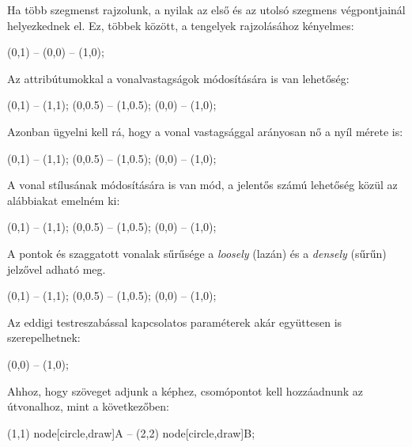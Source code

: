 Ha több szegmenst rajzolunk, a nyilak az első és az utolsó szegmens végpontjainál helyezkednek el. Ez, többek között, a tengelyek rajzolásához kényelmes:

\begin{tikzcode}
\draw [<->] (0,1) -- (0,0) -- (1,0);
\end{tikzcode}

Az attribútumokkal a vonalvastagságok módosítására is van lehetőség:

\begin{tikzcode}
\draw [thin] (0,1) -- (1,1);
\draw [thick] (0,0.5) -- (1,0.5);	
 (0,0) -- (1,0);
\end{tikzcode}

Azonban ügyelni kell rá, hogy a vonal vastagsággal arányosan nő a nyíl mérete is:

\begin{tikzcode}
\draw [->, thin] (0,1) -- (1,1);
\draw [->, thick] (0,0.5) -- (1,0.5);	
 (0,0) -- (1,0);
\end{tikzcode}

A vonal stílusának módosítására is van mód, a jelentős számú lehetőség közül az alábbiakat emelném ki:

\begin{tikzcode}
\draw [dotted] (0,1) -- (1,1);
\draw [dashed] (0,0.5) -- (1,0.5);	
\draw [dashdotted] (0,0) -- (1,0);
\end{tikzcode}

A pontok és szaggatott vonalak sűrűsége a \textit{loosely} (lazán) és a \textit{densely} (sűrűn) jelzővel adható meg.
\begin{tikzcode}
\draw [dashed] (0,1) -- (1,1);
 (0,0.5) -- (1,0.5);	
 (0,0) -- (1,0);
\end{tikzcode}

Az eddigi testreszabással kapcsolatos paraméterek akár együttesen is szerepelhetnek:

\begin{tikzcode}
 (0,0) -- (1,0);
\end{tikzcode}

Ahhoz, hogy szöveget adjunk a képhez, csomópontot kell hozzáadnunk az útvonalhoz, mint a következőben:

\begin{tikzcode}
\draw 
    (1,1) node[circle,draw]{A} 
        -- 
    (2,2) node[circle,draw]{B};	
\end{tikzcode}

